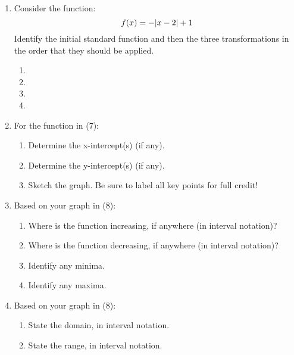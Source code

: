 \documentclass[letterpaper,12pt,fleqn]{article}
\begin{document}
\begin{enumerate}
\newpage

\item Consider the function:
\[f(x)=-\lvert x-2\rvert+1\]
Identify the initial standard function and then the three transformations in the
  order that they should be applied.
\begin{enumerate}
\item
\item
\item
\item
\end{enumerate}

\item For the function in (7):
  \begin{enumerate}
  \item Determine the x-intercept(s) (if any).

    \vspace{2in}

  \item Determine the y-intercept(s) (if any).

    \vspace{1in}

  \item Sketch the graph. Be sure to label all key points for full credit!
  \end{enumerate}

\newpage
\item Based on your graph in (8):
  \begin{enumerate}
  \item Where is the function increasing, if anywhere (in interval notation)?

    \vspace{1in}
    
  \item Where is the function decreasing, if anywhere (in interval notation)?

    \vspace{1in}

  \item Identify any minima.

    \vspace{1in}
    
  \item Identify any maxima.

    \vspace{1in}

  \end{enumerate}

\item Based on your graph in (8):
  \begin{enumerate}
  \item State the domain, in interval notation.

    \vspace{1in}
    
  \item State the range, in interval notation.
  \end{enumerate}
\end{enumerate}
\end{document}
